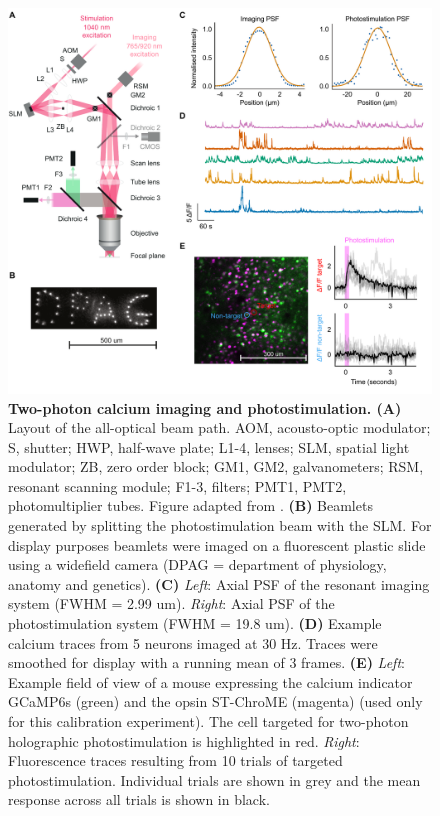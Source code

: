 \begin{figure}[!h]
\includegraphics[scale=0.567]{figures/2p_imaging+photostim.pdf}
\caption[\textbf{Two-photon calcium imaging and photostimulation}]{
\textbf{Two-photon calcium imaging and photostimulation. (A)} Layout of the all-optical beam path. AOM, acousto-optic modulator; S, shutter; HWP, half-wave plate; L1-4, lenses; SLM, spatial light modulator; ZB, zero order block; GM1, GM2, galvanometers; RSM, resonant scanning module; F1-3, filters; PMT1, PMT2, photomultiplier tubes. Figure adapted from \cite{packer_simultaneous_2015}. \textbf{(B)} Beamlets generated by splitting the photostimulation beam with the SLM. For display purposes beamlets were imaged on a fluorescent plastic slide using a widefield camera (DPAG = department of physiology, anatomy and genetics). \textbf{(C)} \textit{Left}: Axial PSF of the resonant imaging system (FWHM = 2.99 um). \textit{Right}: Axial PSF of the photostimulation system (FWHM
= 19.8 um). \textbf{(D)} Example calcium traces from 5 neurons imaged at 30 Hz. Traces were smoothed for display with a running mean of 3 frames. \textbf{(E)} \textit{Left}: Example field of view of a mouse expressing the calcium indicator GCaMP6s (green) and the opsin ST-ChroME \cite{mardinly_precise_2018} (magenta) (used only for this calibration experiment). The cell targeted for two-photon holographic photostimulation is highlighted in red. \textit{Right}: Fluorescence traces resulting from 10 trials of targeted photostimulation. Individual trials are shown in grey and the mean response across all trials is shown in black. 
} 
\label{fig:all-optical}
\end{figure}

